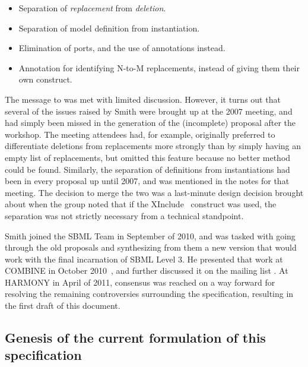 \begin{itemize}\setlength{\parskip}{0ex}

\item Separation of \emph{replacement} from \emph{deletion}.

\item Separation of model definition from instantiation.

\item Elimination of ports, and the use of annotations instead.

\item Annotation for identifying N-to-M replacements, instead of giving
  them their own construct.

\end{itemize}

The message to 
was met with limited discussion.  However, it turns out that several of
the issues raised by Smith were brought up at the 2007 meeting, and had
simply been missed in the generation of the (incomplete) proposal after
the workshop.  The meeting attendees had, for example, originally
preferred to differentiate deletions from replacements more strongly
than by simply having an empty list of replacements, but omitted this
feature because no better method could be found.  Similarly, the
separation of definitions from instantiations had been in every proposal
up until 2007, and was mentioned in the notes for that meeting.  The
decision to merge the two was a last-minute design decision brought
about when the group noted that if the XInclude~\citep{xinclude}
construct was used, the separation was not strictly necessary from a
technical standpoint.

Smith joined the SBML Team in September of 2010, and was tasked with
going through the old proposals and synthesizing from them a new version
that would work with the final incarnation of SBML Level 3.  He
presented that work at COMBINE in October 2010~\citep{smith:2010c}, and
further discussed it on the mailing list
.  At HARMONY in
April of 2011, consensus was reached on a way forward for resolving the
remaining controversies surrounding the specification, resulting in the
first draft of this document.

\subsection{Genesis of the current formulation of this specification}

